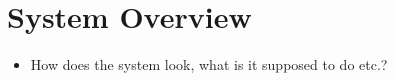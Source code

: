 \chapter{System Overview}
\label{ch:systemOverview}

\begin{itemize}\tightlist
    \item
        How does the system look, what is it supposed to do etc.?
\end{itemize}
